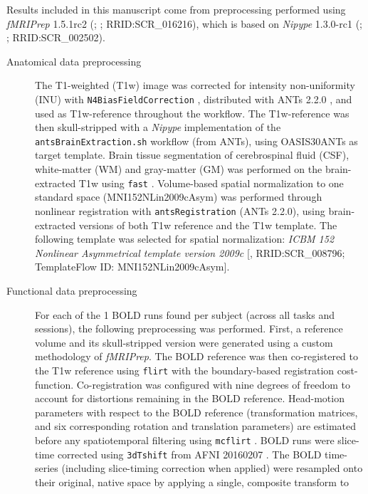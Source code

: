 \documentclass[]{article}
\date{}
\begin{document}
Results included in this manuscript come from preprocessing performed
using \emph{fMRIPrep} 1.5.1rc2 (\citet{fmriprep1}; \citet{fmriprep2};
RRID:SCR\_016216), which is based on \emph{Nipype} 1.3.0-rc1
(\citet{nipype1}; \citet{nipype2}; RRID:SCR\_002502).

\begin{description}
\item[Anatomical data preprocessing]
The T1-weighted (T1w) image was corrected for intensity non-uniformity
(INU) with \texttt{N4BiasFieldCorrection} \citep{n4}, distributed with
ANTs 2.2.0 \citep[RRID:SCR\_004757]{ants}, and used as T1w-reference
throughout the workflow. The T1w-reference was then skull-stripped with
a \emph{Nipype} implementation of the \texttt{antsBrainExtraction.sh}
workflow (from ANTs), using OASIS30ANTs as target template. Brain tissue
segmentation of cerebrospinal fluid (CSF), white-matter (WM) and
gray-matter (GM) was performed on the brain-extracted T1w using
\texttt{fast} \citep[FSL 5.0.9, RRID:SCR\_002823,][]{fsl_fast}.
Volume-based spatial normalization to one standard space
(MNI152NLin2009cAsym) was performed through nonlinear registration with
\texttt{antsRegistration} (ANTs 2.2.0), using brain-extracted versions
of both T1w reference and the T1w template. The following template was
selected for spatial normalization: \emph{ICBM 152 Nonlinear
Asymmetrical template version 2009c} {[}\citet{mni152nlin2009casym},
RRID:SCR\_008796; TemplateFlow ID: MNI152NLin2009cAsym{]}.
\item[Functional data preprocessing]
For each of the 1 BOLD runs found per subject (across all tasks and
sessions), the following preprocessing was performed. First, a reference
volume and its skull-stripped version were generated using a custom
methodology of \emph{fMRIPrep}. The BOLD reference was then
co-registered to the T1w reference using \texttt{flirt} \citep[FSL
5.0.9,][]{flirt} with the boundary-based registration \citep{bbr}
cost-function. Co-registration was configured with nine degrees of
freedom to account for distortions remaining in the BOLD reference.
Head-motion parameters with respect to the BOLD reference
(transformation matrices, and six corresponding rotation and translation
parameters) are estimated before any spatiotemporal filtering using
\texttt{mcflirt} \citep[FSL 5.0.9,][]{mcflirt}. BOLD runs were
slice-time corrected using \texttt{3dTshift} from AFNI 20160207
\citep[RRID:SCR\_005927]{afni}. The BOLD time-series (including
slice-timing correction when applied) were resampled onto their
original, native space by applying a single, composite transform to

\end{description}
\end{document}
